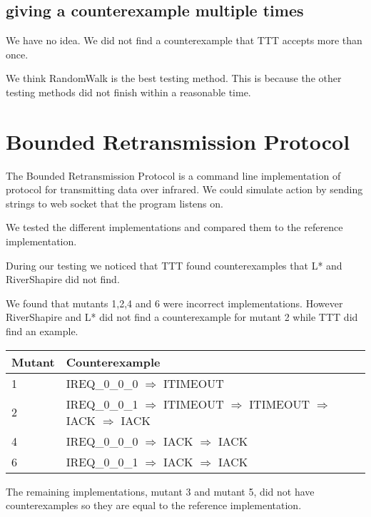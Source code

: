 \documentclass[11pt,a4paper]{article}
\begin{document}
\subsection{giving a counterexample multiple times}
We have no idea. We did not find a counterexample that TTT accepts more than once.

We think RandomWalk is the best testing method. This is because the
other testing methods did not finish within a reasonable time.

\section{Bounded Retransmission Protocol}

The Bounded Retransmission Protocol is a command line implementation
of protocol for transmitting data over infrared. We could simulate
action by sending strings to web socket that the program listens on.

We tested the different implementations and compared them to the
reference implementation.

During our testing we noticed that TTT found counterexamples that L* and
RiverShapire did not find.

We found that mutants 1,2,4 and 6 were incorrect implementations.
However RiverShapire and L* did not find a counterexample for mutant 2
while TTT did find an example.

\begin{center}
\begin{tabular}{l|l}
\textbf{Mutant} & \textbf{Counterexample}\\
\hline
1 & IREQ\_0\_0\_0 $\Rightarrow$ ITIMEOUT\\
2 & IREQ\_0\_0\_1 $\Rightarrow$ ITIMEOUT $\Rightarrow$ ITIMEOUT $\Rightarrow$ IACK $\Rightarrow$ IACK\\
4 & IREQ\_0\_0\_0 $\Rightarrow$ IACK $\Rightarrow$ IACK\\
6 & IREQ\_0\_0\_1 $\Rightarrow$ IACK $\Rightarrow$ IACK\\
\end{tabular}
\end{center}

The remaining implementations, mutant 3 and mutant 5, did not have
counterexamples so they are equal to the reference implementation.
\end{document}
